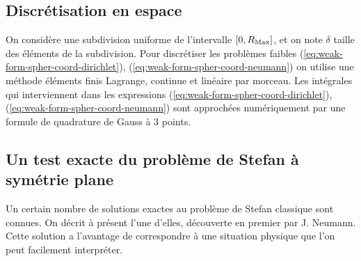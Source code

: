 \subsection*{Discrétisation en espace}
On considère une subdivision uniforme de l'intervalle $[0, R_\mathrm{Max}]$, et
on note $\delta$ taille des éléments de la subdivision. Pour
discrétiser les problèmes faibles
(\ref{eq:weak-form-spher-coord-dirichlet}),
(\ref{eq:weak-form-spher-coord-neumann}) on utilise une méthode
éléments finis Lagrange, continue et linéaire par morceau. Les
intégrales qui interviennent dans les expressions
(\ref{eq:weak-form-spher-coord-dirichlet}),
(\ref{eq:weak-form-spher-coord-neumann}) sont approchées numériquement
par une formule de quadrature de Gauss à 3 points.



\subsection*{Un test exacte du problème de Stefan à symétrie plane}
Un certain nombre de solutions exactes au problème de Stefan
classique sont connues. On décrit à présent l'une d'elles, découverte en
premier par J. Neumann. Cette solution a l'avantage de correspondre à
une situation physique que l'on peut facilement interpréter.


